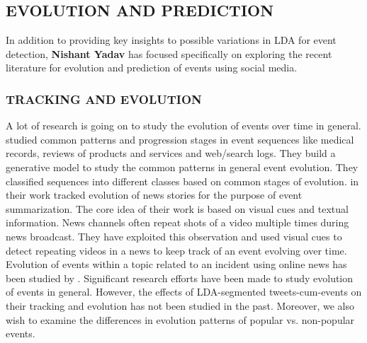 \subsection{\uppercase{Evolution and Prediction}}
In addition to providing key insights to possible variations in LDA for event detection, {\bf Nishant Yadav} has focused specifically on exploring the recent literature for evolution and prediction of events using social media.

\subsubsection{\uppercase{Tracking and Evolution}}
A lot of research is going on to study the evolution of events over time in general. \cite{yang2014finding} studied common patterns and progression stages in event sequences like medical records, reviews of products and services and web/search logs. They build a generative model to study the common patterns in general event evolution. They classified sequences into different classes based on common stages of evolution. \cite{duygulu2004towards} in their work tracked evolution of news stories for the purpose of event summarization. The core idea of their work is based on visual cues and textual information. News channels often repeat shots of a video multiple times during news broadcast. They have exploited this observation and used visual cues to detect repeating videos in a news to keep track of an event evolving over time. Evolution of events within a topic related to an incident using online news has been studied by \cite{yang2009discovering}. Significant research efforts have been made to study evolution of events in general. However, the effects of LDA-segmented tweets-cum-events on their tracking and evolution has not been studied in the past. Moreover, we also wish to examine the differences in evolution patterns of popular vs. non-popular events.

